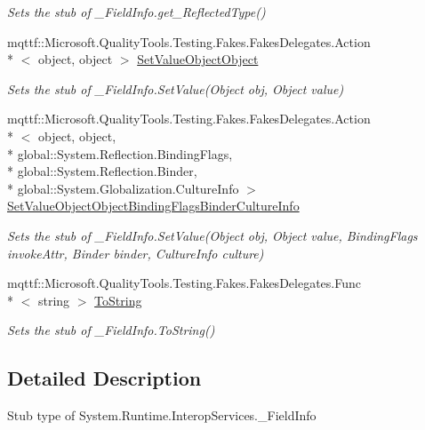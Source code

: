 \begin{DoxyCompactItemize}
\begin{DoxyCompactList}\small\item\em Sets the stub of \-\_\-\-Field\-Info.\-get\-\_\-\-Reflected\-Type()\end{DoxyCompactList}\item 
mqttf\-::\-Microsoft.\-Quality\-Tools.\-Testing.\-Fakes.\-Fakes\-Delegates.\-Action\\*
$<$ object, object $>$ \hyperlink{class_system_1_1_runtime_1_1_interop_services_1_1_fakes_1_1_stub___field_info_af107a455f7ebda7babc6c141e919b897}{Set\-Value\-Object\-Object}
\begin{DoxyCompactList}\small\item\em Sets the stub of \-\_\-\-Field\-Info.\-Set\-Value(\-Object obj, Object value)\end{DoxyCompactList}\item 
mqttf\-::\-Microsoft.\-Quality\-Tools.\-Testing.\-Fakes.\-Fakes\-Delegates.\-Action\\*
$<$ object, object, \\*
global\-::\-System.\-Reflection.\-Binding\-Flags, \\*
global\-::\-System.\-Reflection.\-Binder, \\*
global\-::\-System.\-Globalization.\-Culture\-Info $>$ \hyperlink{class_system_1_1_runtime_1_1_interop_services_1_1_fakes_1_1_stub___field_info_a8651b26e17600f7aeb5851e73ada18a5}{Set\-Value\-Object\-Object\-Binding\-Flags\-Binder\-Culture\-Info}
\begin{DoxyCompactList}\small\item\em Sets the stub of \-\_\-\-Field\-Info.\-Set\-Value(\-Object obj, Object value, Binding\-Flags invoke\-Attr, Binder binder, Culture\-Info culture)\end{DoxyCompactList}\item 
mqttf\-::\-Microsoft.\-Quality\-Tools.\-Testing.\-Fakes.\-Fakes\-Delegates.\-Func\\*
$<$ string $>$ \hyperlink{class_system_1_1_runtime_1_1_interop_services_1_1_fakes_1_1_stub___field_info_a79ea15a0c29a97795a9f46f5ec2cff88}{To\-String}
\begin{DoxyCompactList}\small\item\em Sets the stub of \-\_\-\-Field\-Info.\-To\-String()\end{DoxyCompactList}\end{DoxyCompactItemize}


\subsection{Detailed Description}
Stub type of System.\-Runtime.\-Interop\-Services.\-\_\-\-Field\-Info



